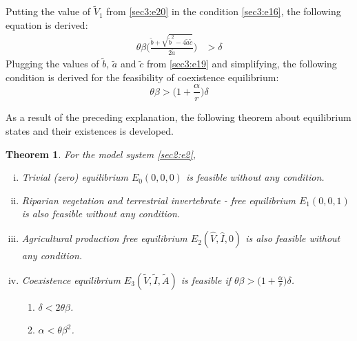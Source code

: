 \documentclass[12pt]{article}
\newtheorem{theorem}{Theorem}[section]
\numberwithin{equation}{section}
\begin{document}
\begin{enumerate}[i)]
Putting the value of $\tilde V_1$ from \eqref{sec3:e20} in the condition \eqref{sec3:e16}, the following equation is derived:
\begin{align}\label{sec3:e23}
\theta \beta \bigg(  \frac{\tilde b + \sqrt{\tilde b^2 - 4\tilde a \tilde c}}{2 \tilde a} \bigg) &> \delta 
\end{align}
Plugging the values of $\tilde b$, $\tilde a$ and $\tilde c$ from \eqref{sec3:e19} and simplifying, the following condition is derived for the feasibility of coexistence equilibrium:
\begin{equation} \label{sec3:e24}
\theta \beta > \bigg(1+\frac{\alpha}{r}\bigg)\delta
\end{equation}
\end{enumerate}
As a result of the preceding explanation, the following theorem about equilibrium states and their existences is developed.
\begin{theorem}\label{Theorem 3.3}
For the model system \eqref{sec2:e2},
\begin{enumerate}[i.)]
\item Trivial (zero) equilibrium $E_0(0,0,0)$ is feasible without any condition.
\item Riparian vegetation and terrestrial invertebrate - free equilibrium $E_1(0,0,1)$ is also feasible without any condition.
\item Agricultural production free equilibrium $E_2(\hat V, \hat I, 0)$ is also feasible without any condition.
\item Coexistence equilibrium  $E_3(\tilde V, \tilde I, \tilde A)$ is feasible if $\theta \beta > \bigg(1+\frac{\alpha}{r}\bigg)\delta$.
\begin{enumerate}
     \item $\delta < 2 \theta \beta$.
     \item $\alpha < \theta \beta^2$.
\end{enumerate}
\end{enumerate}
\end{theorem}
\vspace{-1cm}
\end{document}
